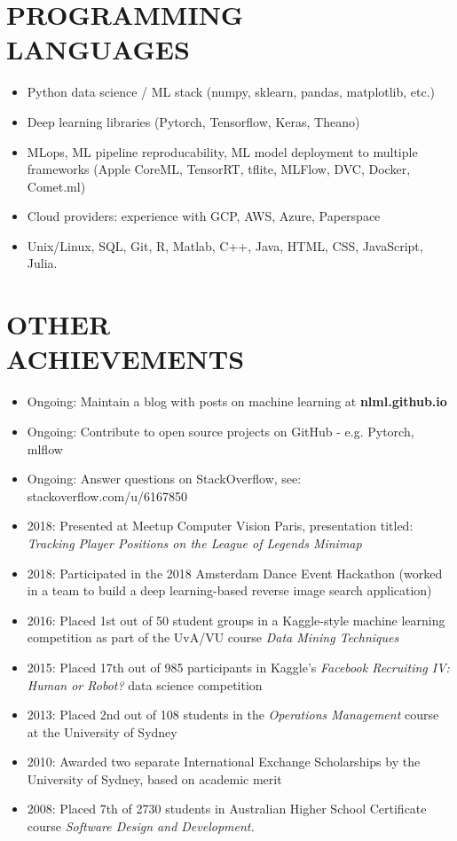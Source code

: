 \documentclass[margin]{res}
\begin{document}
\begin{resume}
		\section{PROGRAMMING\\LANGUAGES}
		\begin{itemize}
			\item Python data science / ML stack (numpy, sklearn, pandas, matplotlib, etc.)
			\item Deep learning libraries (Pytorch, Tensorflow, Keras, Theano)
			\item MLops, ML pipeline reproducability, ML model deployment to multiple frameworks (Apple CoreML, TensorRT, tflite, MLFlow, DVC, Docker, Comet.ml)
			\item Cloud providers: experience with GCP, AWS, Azure, Paperspace
			\item Unix/Linux, SQL, Git, R, Matlab, C++, Java, HTML, CSS, JavaScript, Julia.
		\end{itemize}
		
		\section{OTHER \\ ACHIEVEMENTS}
		
		\begin{itemize}
			\item Ongoing: Maintain a blog with posts on machine learning at \textbf{nlml.github.io}
			\item Ongoing: Contribute to open source projects on GitHub - e.g. Pytorch, mlflow
			\item Ongoing: Answer questions on StackOverflow, see:\\stackoverflow.com/u/6167850
			\item 2018: Presented at Meetup Computer Vision Paris, presentation titled:\\ \emph{Tracking Player Positions on the League of Legends Minimap}
			\item 2018: Participated in the 2018 Amsterdam Dance Event Hackathon (worked in a team to build a deep learning-based reverse image search application)
			\item 2016: Placed 1st out of 50 student groups in a Kaggle-style machine learning competition as part of the UvA/VU course \textit{Data Mining Techniques}
			\item 2015: Placed 17th out of 985 participants in Kaggle's {\sl Facebook Recruiting IV: Human or Robot?} data science competition
			\item 2013: Placed 2nd out of 108 students in the \textit{Operations Management} course at the University of Sydney
			\item 2010: Awarded two separate International Exchange Scholarships by the University of Sydney, based on academic merit
			\item 2008: Placed 7th of 2730 students in Australian Higher School Certificate course {\sl Software Design and Development.}
		\end{itemize}
		
	\end{resume}
	
\end{document}
